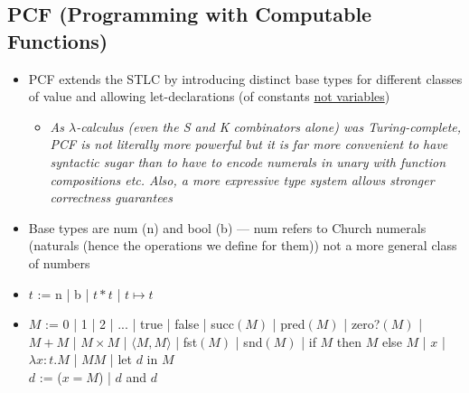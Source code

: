 \documentclass[20pt,a4paper,landscape]{extarticle}
\begin{document}
\begin{flushleft}
\subsection{PCF (Programming with Computable Functions)}
\begin{itemize}
\item PCF extends the STLC by introducing distinct base types for different classes of value and allowing let-declarations (of constants \underline{not variables})
\begin{itemize}
    \item \textit{As $\lambda$-calculus (even the S and K combinators alone) was Turing-complete, PCF is not literally more powerful but it is far more convenient to have syntactic sugar than to have to encode numerals in unary with function compositions etc. Also, a more expressive type system allows stronger correctness guarantees}
\end{itemize}
\item Base types are num (n) and bool (b) --- num refers to Church numerals (naturals (hence the operations we define for them)) not a more general class of numbers
\item $t$ := n | b | $t \ast t$ | $t \mapsto t$
\item $M$ := 0 | 1 | 2 | ... | true | false | succ$(M)$ | pred$(M)$ | zero?$(M)$ | $M + M$ | $M \times M$ | $\langle M, M \rangle$ | fst$(M)$ | snd$(M)$ | if $M$ then $M$ else $M$ | $x$ | $\lambda x: t. M$ | $M M$ | let $d$ in $M$\\
$d$ := ($x = M$) | $d$ and $d$
\end{itemize}
\clearpage

\end{flushleft}
\end{document}
